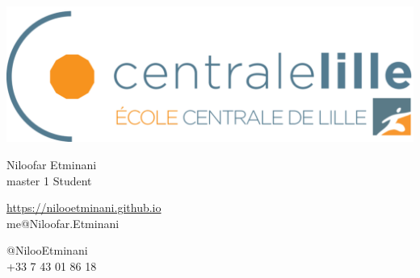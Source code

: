 \documentclass{article}
\begin{document}
\centering \includegraphics[width=.25\linewidth]{logo}\\[5pt]
\parbox{2in}{\Large \centering Niloofar Etminani\\[1pt]
\normalsize master 1 Student}

\vfill
\raggedright
\begin{multicols}{2}
\href{https://nilooetminani.github.io}{https://nilooetminani.github.io}
\\
me@Niloofar.Etminani

\columnbreak
\raggedleft
@NilooEtminani\\
+33 7 43 01 86 18%
\end{multicols}%
\end{document}
